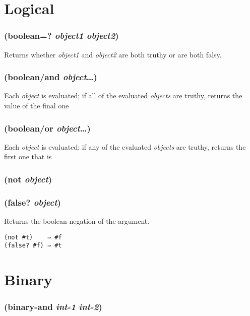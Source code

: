 \documentclass{article}
\begin{document}
\section{Logical}\label{sec:logical}

\subsubsection{(boolean=? \emph{object1} \emph{object2})}

Returns whether \emph{object1} and \emph{object2} are both truthy or are both falsy.

\subsubsection{(boolean/and \emph{object}\ldots{})}

Each \emph{object} is evaluated; if all of the evaluated \emph{objects} are truthy, returns
the value of the final one

\subsubsection{(boolean/or \emph{object}\ldots{})}

Each \emph{object} is evaluated; if any of the evaluated \emph{objects} are truthy, returns
the first one that is

\subsubsection{(not \emph{object})}

\subsubsection{(false? \emph{object})}

Returns the boolean negation of the argument.

\begin{verbatim}
(not #t)    ⇒ #f
(false? #f) ⇒ #t
\end{verbatim}

\section{Binary}\label{sec:binary}

\subsubsection{(binary-and \emph{int-1} \emph{int-2})}
\end{document}
